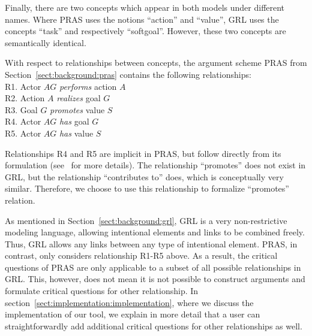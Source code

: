 Finally, there are two concepts which appear in both models under different names. Where PRAS uses the notions ``action'' and ``value'', GRL uses the concepts ``task'' and respectively ``softgoal''. However, these two concepts are semantically identical.

With respect to relationships between concepts, the argument scheme PRAS from Section~\ref{sect:background:pras} contains the following relationships:\\

\noindent
R1. Actor $AG$ \emph{performs} action $A$\\
R2. Action $A$ \emph{realizes} goal $G$\\
R3. Goal $G$ \emph{promotes} value $S$\\
R4. Actor $AG$ \emph{has} goal $G$\\
R5. Actor $AG$ \emph{has} value $S$\\

\noindent

Relationships R4 and R5 are implicit in PRAS, but follow directly from its formulation (see~\cite{atkinson2007} for more details). The relationship ``promotes'' does not exist in GRL, but the relationship ``contributes to'' does, which is conceptually very similar. Therefore, we choose to use this relationship to formalize ``promotes'' relation.

As mentioned in Section~\ref{sect:background:grl}, GRL is a very non-restrictive modeling language, allowing intentional elements and links to be combined freely. Thus, GRL allows any links between any type of intentional element. PRAS, in contrast, only considers relationship R1-R5 above. As a result, the critical questions of PRAS are only applicable to a subset of all possible relationships in GRL. This, however, does not mean it is not possible to construct arguments and formulate critical questions for other relationship. In section~\ref{sect:implementation:implementation}, where we discuss the implementation of our tool, we explain in more detail that a user can straightforwardly add additional critical questions for other relationships as well.